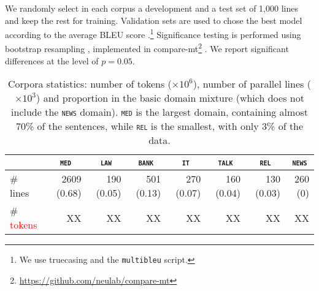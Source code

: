 \documentclass[11pt,a4paper]{article}
\newcommand{\fyDone}[1]{\done[FY]\Todo[FY:]{\textcolor{orange}{#1}}}
\newcommand{\revision}[1]{\textcolor{red}{#1}}
\newcommand{\domain}[1]{\texttt{\textsc{#1}}}
\begin{document}
We randomly select in each corpus a development and a test set of 1,000 lines and keep the rest for training. Validation sets are used to chose the best model according to the average BLEU score \cite{Papineni02bleu}.\footnote{We use truecasing and the \texttt{multibleu} script.}\fyDone{A word about meta-parameter settings} Significance testing is performed using bootstrap resampling \cite{Koehn04statistical}, implemented in compare-mt\footnote{\url{https://github.com/neulab/compare-mt}} \cite{Neubig19compare-mt}. We report significant differences at the level of $p=0.05$.\fyDone{Fix correct p value}


\begin{table*}[htbp]
  \centering
  \begin{tabular}{|l|rrrrrrr|} %
    \cline{2-8} 
    \multicolumn{1}{c|}{} & \multicolumn{1}{c}{\domain{med}} & \multicolumn{1}{c}{\domain{law}} & \multicolumn{1}{c}{\domain{bank}} & \multicolumn{1}{c}{\domain{it}} & \multicolumn{1}{c}{\domain{talk}} & \multicolumn{1}{c}{\domain{rel}} & \multicolumn{1}{c|}{\domain{news}} \\
    \hline 
    \# lines & 2609 (0.68) & 190 (0.05)  & 501 (0.13) & 270 (0.07) & 160 (0.04) & 130 (0.03) & 260 (0) \\
    \# \revision{tokens} &  XX  & XX &  XX &  XX &  XX &  XX &  XX  \\
    \hline
  \end{tabular}
\caption{Corpora statistics: number of tokens ($\times 10^6$), number of parallel lines ($\times 10^3$) and proportion in the basic domain mixture (which does not include the \domain{news} domain). \domain{med} is the largest domain, containing almost 70\% of the sentences, while \domain{rel} is the smallest, with only 3\% of the data.}
\label{tab:Corpora}
\end{table*}
\end{document}
